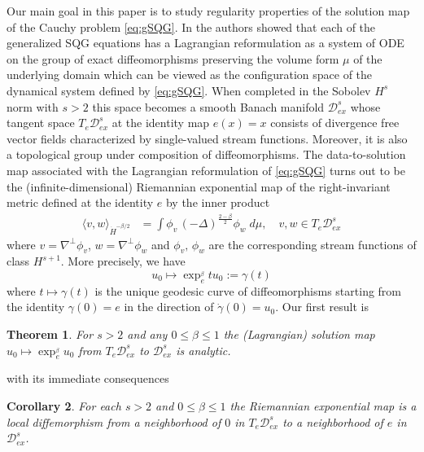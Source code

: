 \documentclass[11pt]{amsart}
\newtheorem{theorem}{Theorem}%
\newtheorem{corollary}[theorem]{Corollary}
\numberwithin{equation}{section}
\begin{document}
Our main goal in this paper is to study regularity properties of 
the solution map of the Cauchy problem \eqref{eq:gSQG}. 
In \cite{MV2023} the authors showed that each of the generalized SQG equations has a Lagrangian reformulation as a system of ODE 
on the group of exact diffeomorphisms preserving 
the volume form $\mu$ of the underlying domain 
which can be viewed as the configuration space of 
the dynamical system defined by \eqref{eq:gSQG}. 
When completed in the Sobolev $H^s$ norm with $s>2$ 
this space becomes a smooth Banach manifold 
$\mathcal{D}_{ex}^s$ whose tangent space 
$T_{e}\mathcal{D}_{ex}^s$ at the identity map $e(x)=x$ 
consists of divergence free vector fields characterized by 
single-valued stream functions. 
Moreover, it is also a topological group 
under composition of diffeomorphisms. 
%
The data-to-solution map associated with the Lagrangian reformulation of \eqref{eq:gSQG} turns out to be the (infinite-dimensional) Riemannian exponential map of the right-invariant metric defined at the identity $e$ by the inner product
% 
\begin{align} \label{eq:beta-met} 
\langle v, w \rangle_{\dot{H}^{ -\beta/2 } } 
&= 
\int 
\phi_v \, (-\Delta)^{\frac{2-\beta}{2}} \phi_w 
\; d\mu, 
\quad 
v, w\in T_{e}\mathcal{D}_{ex}^s 
\end{align} 
% 
where $v = \nabla^\perp\phi_v$, 
$w = \nabla^\perp\phi_w$ 
and $\phi_v, \, \phi_w$ 
are the corresponding stream functions 
of class $H^{s+1}$. 
% 
More precisely, we have 
% 
\begin{equation} \label{eq:exp} 
 u_0 \mapsto \exp_e^{_{\beta}}t u_0 := \gamma(t) 
\end{equation} 
% 
where $t\mapsto\gamma(t)$ is the unique geodesic curve 
of diffeomorphisms 
starting from the identity $\gamma(0)=e$ 
in the direction of $\dot{\gamma}(0)= u_0$. 
Our first result is 
% 
\begin{theorem} \label{analytic} 
For $s > 2$ and any $0\le \beta\le 1$ 
the (Lagrangian) solution map 
$u_0\mapsto \exp_e^{_{\beta}} u_0$ 
from $ T_{e}\mathcal{D}_{ex}^s$ 
to $\mathcal D_{ex}^s$ is analytic. 
\end{theorem} 
% 
with its immediate consequences 
% 
\begin{corollary} \label{cor:locDiff} 
For each $s>2$ and $0\le\beta\le 1$ 
the Riemannian exponential map is a local diffemorphism 
from a neighborhood of $0$ in $T_{e}\mathcal{D}_{ex}^s$ 
to a neighborhood of $e$ in $\mathcal{D}_{ex}^s$. 
\end{corollary} 
\end{document}
